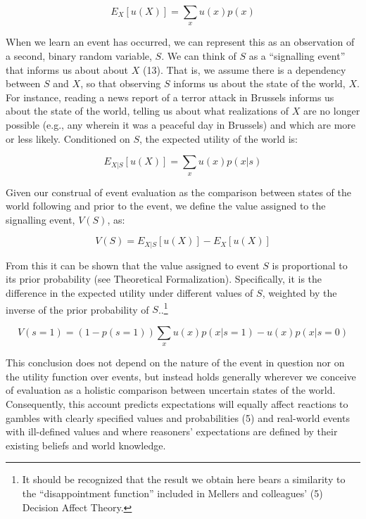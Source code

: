 \documentclass[9pt,twocolumn,twoside,lineno]{pnas-new}
\begin{document}
\begin{equation}
E_X[u(X)] = \sum_x u(x)p(x)
\end{equation}

When we learn an event has occurred, we can represent this as an
observation of a second, binary random variable, \(S\). We can think of
\(S\) as a ``signalling event'' that informs us about about \(X\) (13).
That is, we assume there is a dependency between \(S\) and \(X\), so
that observing \(S\) informs us about the state of the world, \(X\). For
instance, reading a news report of a terror attack in Brussels informs
us about the state of the world, telling us about what realizations of
\(X\) are no longer possible (e.g., any wherein it was a peaceful day in
Brussels) and which are more or less likely. Conditioned on \(S\), the
expected utility of the world is:

\begin{equation}
E_{X|S}[u(X)] = \sum_x u(x)p(x|s)
\end{equation}

Given our construal of event evaluation as the comparison between states
of the world following and prior to the event, we define the value
assigned to the signalling event, \(V(S)\), as:

\begin{equation}
V(S) = E_{X|S}[u(X)] - E_X[u(X)]
\end{equation}

From this it can be shown that the value assigned to event \(S\) is
proportional to its prior probability (see Theoretical Formalization).
Specifically, it is the difference in the expected utility under
different values of \(S\), weighted by the inverse of the prior
probability of \(S\)..\footnote{It should be recognized that the result
  we obtain here bears a similarity to the ``disappointment function''
  included in Mellers and colleagues' (5) Decision Affect Theory.}

\begin{equation}
V(s=1)=(1-p(s=1))\sum_x u(x)p(x|s=1) - u(x)p(x|s=0)
\end{equation}

This conclusion does not depend on the nature of the event in question
nor on the utility function over events, but instead holds generally
wherever we conceive of evaluation as a holistic comparison between
uncertain states of the world. Consequently, this account predicts
expectations will equally affect reactions to gambles with clearly
specified values and probabilities (5) and real-world events with
ill-defined values and where reasoners' expectations are defined by
their existing beliefs and world knowledge.
\end{document}
